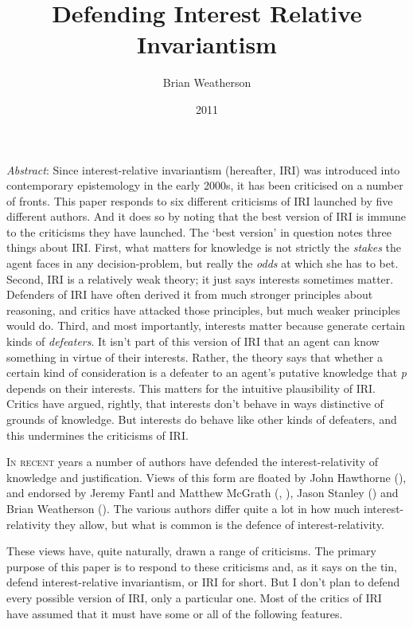 \documentclass[
  11pt,
  letterpaper,
  DIV=11,
  numbers=noendperiod,
  twoside]{scrartcl}
\title{Defending Interest Relative Invariantism}
\author{Brian Weatherson}
\date{2011}
\renewenvironment{abstract}
 {\vspace{-1.25cm}
 \quotation\small\noindent\emph{Abstract}:}
 {\endquotation}
\renewenvironment{abstract}
 {\quotation\small\noindent\emph{Abstract}:}
 {\endquotation\vspace{-0.02cm}}
\begin{document}
\maketitle
\begin{abstract}
Since interest-relative invariantism (hereafter, IRI) was introduced
into contemporary epistemology in the early 2000s, it has been
criticised on a number of fronts. This paper responds to six different
criticisms of IRI launched by five different authors. And it does so by
noting that the best version of IRI is immune to the criticisms they
have launched. The `best version' in question notes three things about
IRI. First, what matters for knowledge is not strictly the \emph{stakes}
the agent faces in any decision-problem, but really the \emph{odds} at
which she has to bet. Second, IRI is a relatively weak theory; it just
says interests sometimes matter. Defenders of IRI have often derived it
from much stronger principles about reasoning, and critics have attacked
those principles, but much weaker principles would do. Third, and most
importantly, interests matter because generate certain kinds of
\emph{defeaters}. It isn't part of this version of IRI that an agent can
know something in virtue of their interests. Rather, the theory says
that whether a certain kind of consideration is a defeater to an agent's
putative knowledge that \emph{p} depends on their interests. This
matters for the intuitive plausibility of IRI. Critics have argued,
rightly, that interests don't behave in ways distinctive of grounds of
knowledge. But interests do behave like other kinds of defeaters, and
this undermines the criticisms of IRI.
\end{abstract}


\lettrine{I}{n recent} years a number of authors have defended the
interest-relativity of knowledge and justification. Views of this form
are floated by John Hawthorne (), and
endorsed by Jeremy Fantl and Matthew McGrath
(, ),
Jason Stanley () and Brian
Weatherson (). The various
authors differ quite a lot in how much interest-relativity they allow,
but what is common is the defence of interest-relativity.

These views have, quite naturally, drawn a range of criticisms. The
primary purpose of this paper is to respond to these criticisms and, as
it says on the tin, defend interest-relative invariantism, or IRI for
short. But I don't plan to defend every possible version of IRI, only a
particular one. Most of the critics of IRI have assumed that it must
have some or all of the following features.
\end{document}
